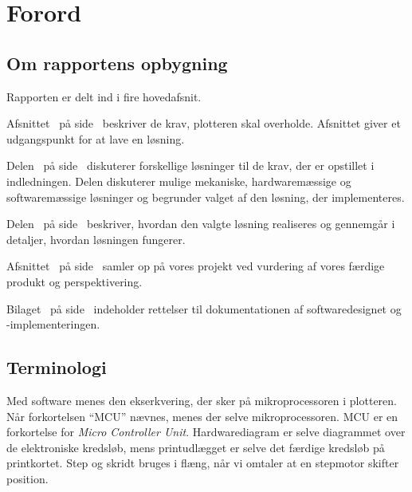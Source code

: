 \chapter{Forord}

\section{Om rapportens opbygning}

Rapporten er delt ind i fire hovedafsnit.

Afsnittet~ på side~\pageref{ch:indledning}
beskriver de krav, plotteren skal overholde. Afsnittet giver et
udgangspunkt for at lave en løsning.

Delen~ på side~\pageref{prt:design} diskuterer
forskellige løsninger til de krav, der er opstillet i
indledningen. Delen diskuterer mulige mekaniske, hardwaremæssige og
softwaremæssige løsninger og begrunder valget af den løsning, der
implementeres.

Delen~ på
side~\pageref{prt:implementering} beskriver, hvordan den valgte
løsning realiseres og gennemgår i detaljer, hvordan løsningen
fungerer.

Afsnittet~ på side~\pageref{ch:afslutning}
samler op på vores projekt ved vurdering af vores færdige produkt og
perspektivering.

Bilaget~ på
side~\pageref{ch:bilag-rettelser-software} indeholder rettelser til
dokumentationen af softwaredesignet og -implementeringen.


\section{Terminologi}


Med software menes den ekserkvering, der sker på mikroprocessoren i
plotteren. Når forkortelsen \enquote{MCU} nævnes, menes der selve
mikroprocessoren. MCU er en forkortelse for \textit{Micro Controller
  Unit}. Hardwarediagram er selve diagrammet over de elektroniske
kredsløb, mens printudlægget er selve det færdige kredsløb på
printkortet. Step og skridt bruges i flæng, når vi omtaler at en
stepmotor skifter position.  

